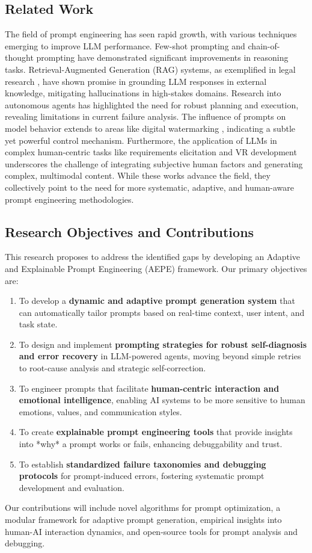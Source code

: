 \documentclass{article}
\begin{document}
\subsection{Related Work}
The field of prompt engineering has seen rapid growth, with various techniques emerging to improve LLM performance. Few-shot prompting \cite{paper1} and chain-of-thought prompting \cite{paper1} have demonstrated significant improvements in reasoning tasks. Retrieval-Augmented Generation (RAG) systems, as exemplified in legal research \cite{paper5}, have shown promise in grounding LLM responses in external knowledge, mitigating hallucinations in high-stakes domains. Research into autonomous agents \cite{paper1} has highlighted the need for robust planning and execution, revealing limitations in current failure analysis. The influence of prompts on model behavior extends to areas like digital watermarking \cite{paper3}, indicating a subtle yet powerful control mechanism. Furthermore, the application of LLMs in complex human-centric tasks like requirements elicitation \cite{paper2} and VR development \cite{paper4} underscores the challenge of integrating subjective human factors and generating complex, multimodal content. While these works advance the field, they collectively point to the need for more systematic, adaptive, and human-aware prompt engineering methodologies.

\subsection{Research Objectives and Contributions}
This research proposes to address the identified gaps by developing an Adaptive and Explainable Prompt Engineering (AEPE) framework. Our primary objectives are:
\begin{enumerate}[label=\arabic*.]
    \item To develop a \textbf{dynamic and adaptive prompt generation system} that can automatically tailor prompts based on real-time context, user intent, and task state.
    \item To design and implement \textbf{prompting strategies for robust self-diagnosis and error recovery} in LLM-powered agents, moving beyond simple retries to root-cause analysis and strategic self-correction.
    \item To engineer prompts that facilitate \textbf{human-centric interaction and emotional intelligence}, enabling AI systems to be more sensitive to human emotions, values, and communication styles.
    \item To create \textbf{explainable prompt engineering tools} that provide insights into *why* a prompt works or fails, enhancing debuggability and trust.
    \item To establish \textbf{standardized failure taxonomies and debugging protocols} for prompt-induced errors, fostering systematic prompt development and evaluation.
\end{enumerate}
Our contributions will include novel algorithms for prompt optimization, a modular framework for adaptive prompt generation, empirical insights into human-AI interaction dynamics, and open-source tools for prompt analysis and debugging.
\end{document}
